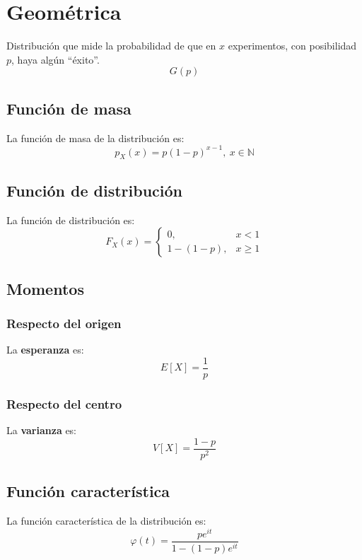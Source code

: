 \section{Geométrica}
\label{sec:geometrica}
Distribución que mide la probabilidad de que en $x$ experimentos, con posibilidad
$p$, haya algún ``éxito''.
\[
\boxed{G\left( p \right)}
\]

\subsection{Función de masa}
La función de masa de la distribución es:
\[
p_X \left( x \right) = p \left( 1 - p \right)^{x - 1},\ x \in \mathbb{N}
\]

\subsection{Función de distribución}
La función de distribución es:
\[
F_X\left( x \right) = \begin{cases}
    0, &x < 1\\ 
    1 - \left( 1 - p \right), &x \ge 1
\end{cases}
\]

\subsection{Momentos}

\subsubsection*{Respecto del origen}
La \textbf{esperanza} es: 
\[
    E\left[ X \right] = \frac{1}{p} 
\]
\subsubsection*{Respecto del centro}
La \textbf{varianza} es:
\[
    V\left[ X \right] = \frac{1 - p}{p^2}
\]

\subsection{Función característica}
La función característica de la distribución es:
\[
\varphi\left( t \right) = \frac{p e^{it}}{1 - \left( 1 - p \right)e^{it}}
\]

